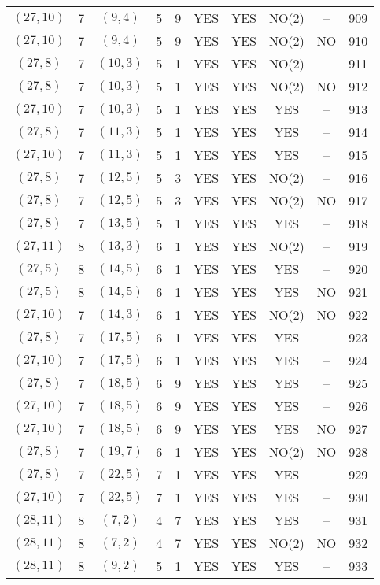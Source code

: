 \begin{longtable}{|c|c|c|c|c|c|c|c|c|c|}
$(27, 10)$ & 7 & $(9, 4)$ & 5 & 9 & YES & YES & NO(2) & -- & 909\\
$(27, 10)$ & 7 & $(9, 4)$ & 5 & 9 & YES & YES & NO(2) & NO & 910\\
$(27, 8)$ & 7 & $(10, 3)$ & 5 & 1 & YES & YES & NO(2) & -- & 911\\
$(27, 8)$ & 7 & $(10, 3)$ & 5 & 1 & YES & YES & NO(2) & NO & 912\\
$(27, 10)$ & 7 & $(10, 3)$ & 5 & 1 & YES & YES & YES & -- & 913\\
$(27, 8)$ & 7 & $(11, 3)$ & 5 & 1 & YES & YES & YES & -- & 914\\
$(27, 10)$ & 7 & $(11, 3)$ & 5 & 1 & YES & YES & YES & -- & 915\\
$(27, 8)$ & 7 & $(12, 5)$ & 5 & 3 & YES & YES & NO(2) & -- & 916\\
$(27, 8)$ & 7 & $(12, 5)$ & 5 & 3 & YES & YES & NO(2) & NO & 917\\
$(27, 8)$ & 7 & $(13, 5)$ & 5 & 1 & YES & YES & YES & -- & 918\\
$(27, 11)$ & 8 & $(13, 3)$ & 6 & 1 & YES & YES & NO(2) & -- & 919\\
$(27, 5)$ & 8 & $(14, 5)$ & 6 & 1 & YES & YES & YES & -- & 920\\
$(27, 5)$ & 8 & $(14, 5)$ & 6 & 1 & YES & YES & YES & NO & 921\\
$(27, 10)$ & 7 & $(14, 3)$ & 6 & 1 & YES & YES & NO(2) & NO & 922\\
$(27, 8)$ & 7 & $(17, 5)$ & 6 & 1 & YES & YES & YES & -- & 923\\
$(27, 10)$ & 7 & $(17, 5)$ & 6 & 1 & YES & YES & YES & -- & 924\\
$(27, 8)$ & 7 & $(18, 5)$ & 6 & 9 & YES & YES & YES & -- & 925\\
$(27, 10)$ & 7 & $(18, 5)$ & 6 & 9 & YES & YES & YES & -- & 926\\
$(27, 10)$ & 7 & $(18, 5)$ & 6 & 9 & YES & YES & YES & NO & 927\\
$(27, 8)$ & 7 & $(19, 7)$ & 6 & 1 & YES & YES & NO(2) & NO & 928\\
$(27, 8)$ & 7 & $(22, 5)$ & 7 & 1 & YES & YES & YES & -- & 929\\
$(27, 10)$ & 7 & $(22, 5)$ & 7 & 1 & YES & YES & YES & -- & 930\\
$(28, 11)$ & 8 & $(7, 2)$ & 4 & 7 & YES & YES & YES & -- & 931\\
$(28, 11)$ & 8 & $(7, 2)$ & 4 & 7 & YES & YES & NO(2) & NO & 932\\
$(28, 11)$ & 8 & $(9, 2)$ & 5 & 1 & YES & YES & YES & -- & 933\\

\end{longtable}
